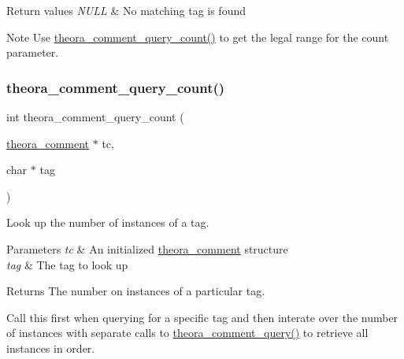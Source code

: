 \begin{DoxyRetVals}{Return values}
{\em N\+U\+LL} & No matching tag is found\\
\hline
\end{DoxyRetVals}
\begin{DoxyNote}{Note}
Use \hyperlink{group__oldfuncs_ga10f66a3c752442a3e0c0098e0f88df8b}{theora\+\_\+comment\+\_\+query\+\_\+count()} to get the legal range for the count parameter. 
\end{DoxyNote}
\mbox{\label{group__oldfuncs_ga10f66a3c752442a3e0c0098e0f88df8b}} 
\subsubsection{\texorpdfstring{theora\+\_\+comment\+\_\+query\+\_\+count()}{theora\_comment\_query\_count()}}
{\footnotesize\ttfamily int theora\+\_\+comment\+\_\+query\+\_\+count (\begin{DoxyParamCaption}\item[{\hyperlink{structtheora__comment}{theora\+\_\+comment} $\ast$}]{tc,  }\item[{char $\ast$}]{tag }\end{DoxyParamCaption})}

Look up the number of instances of a tag. 
\begin{DoxyParams}{Parameters}
{\em tc} & An initialized \hyperlink{structtheora__comment}{theora\+\_\+comment} structure \\
\hline
{\em tag} & The tag to look up \\
\hline
\end{DoxyParams}
\begin{DoxyReturn}{Returns}
The number on instances of a particular tag.
\end{DoxyReturn}
Call this first when querying for a specific tag and then interate over the number of instances with separate calls to \hyperlink{group__oldfuncs_ga4361f6001abb5c83c36a2ddfb648a8dc}{theora\+\_\+comment\+\_\+query()} to retrieve all instances in order. \mbox{\label{group__oldfuncs_ga186773db3bc8cd550047e7df1b2ba2c9}} 
